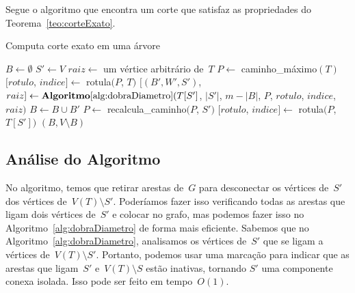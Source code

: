 
		Segue o algoritmo que encontra um corte que satisfaz as 
		propriedades do Teorema~\ref{teo:corteExato}.
		
		\bigskip
		\bigskip
		\begin{algorithm}[H]
		\label{alg:corteExato}

			\caption{Computa corte exato em uma árvore}
			$B\gets \emptyset$\;
			$S'\gets V$\;
			$raiz\gets$ um vértice arbitrário de~$T$\;
			$P\gets$ {\sc caminho\_máximo}$(T)$\;
			$[rotulo$, $indice]\gets$ {\sc rotula}$(P$, $T)$
			{
				$[(B',W',S')$, $raiz]\gets
				\mathbf {Algoritmo\ref{alg:dobraDiametro}}(T[S']$,
				$|S'|$, $m-|B|$, $P$, $rotulo$, $indice$, $raiz)$\;
				$B\gets B\cup B'$\;
				$P\gets$ {\sc recalcula\_caminho}$(P$, $S')$\;
				$[rotulo$, $indice]\gets$ {\sc rotula}$(P$, $T[S'])$
			}
			\Return $(B,V\setminus B)$\;

		\end{algorithm}	

		\bigskip
		\bigskip
		\bigskip

		\subsection*{Análise do Algoritmo}


		No algoritmo, temos que retirar arestas de~$G$ para desconectar
		os vértices de~$S'$ dos vértices de~$V(T)\setminus S'$.
		Poderíamos fazer isso verificando todas as arestas que 
		ligam dois vértices de~$S'$ e colocar no grafo, mas podemos
		fazer isso no Algoritmo~\ref{alg:dobraDiametro} de forma 
		mais eficiente. 
		Sabemos que no Algoritmo~\ref{alg:dobraDiametro},
		analisamos os vértices de~$S'$ que se ligam a vértices 
		de~$V(T)\setminus S'$. 
		Portanto, podemos usar uma marcação para indicar que as 
		arestas que ligam~$S'$ e~$V(T)\setminus S$ estão inativas, 
		tornando $S'$ uma componente conexa isolada. 
		Isso pode ser feito em tempo~$O(1)$.

